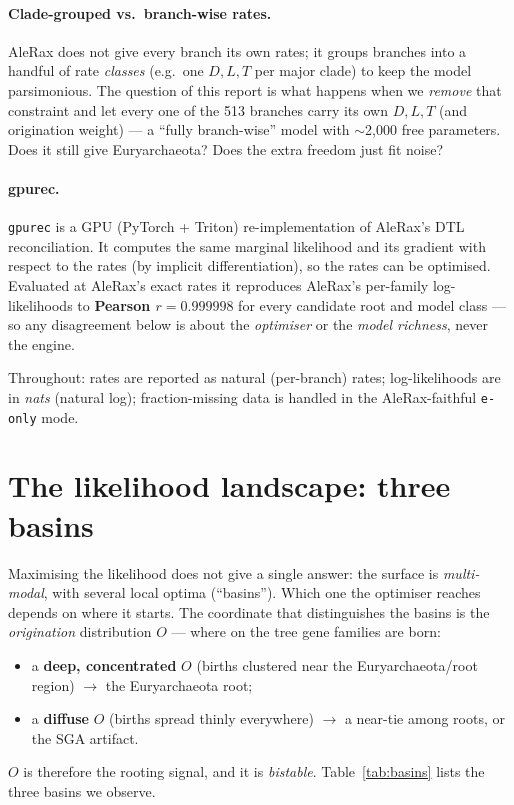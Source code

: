 \documentclass[11pt]{article}
\newcommand{\code}[1]{\texttt{\small #1}}
\begin{document}
\paragraph{Clade-grouped vs.\ branch-wise rates.} AleRax does not give every branch its own
rates; it groups branches into a handful of rate \emph{classes} (e.g.\ one $D,L,T$ per major
clade) to keep the model parsimonious. The question of this report is what happens when we
\emph{remove} that constraint and let every one of the 513 branches carry its own $D,L,T$
(and origination weight) --- a ``fully branch-wise'' model with $\sim$2{,}000 free
parameters. Does it still give Euryarchaeota? Does the extra freedom just fit noise?

\paragraph{gpurec.} \code{gpurec} is a GPU (PyTorch + Triton) re-implementation of AleRax's
DTL reconciliation. It computes the same marginal likelihood and its gradient with respect
to the rates (by implicit differentiation), so the rates can be optimised. Evaluated at
AleRax's exact rates it reproduces AleRax's per-family log-likelihoods to
\textbf{Pearson $r=0.999998$} for every candidate root and model class --- so any
disagreement below is about the \emph{optimiser} or the \emph{model richness}, never the
engine.

Throughout: rates are reported as natural (per-branch) rates; log-likelihoods are in
\emph{nats} (natural log); fraction-missing data is handled in the AleRax-faithful
\code{e-only} mode.

\FloatBarrier
\section{The likelihood landscape: three basins}
\label{sec:basins}
Maximising the likelihood does not give a single answer: the surface is \emph{multi-modal},
with several local optima (``basins''). Which one the optimiser reaches depends on where it
starts. The coordinate that distinguishes the basins is the \emph{origination} distribution
$O$ --- where on the tree gene families are born:
\begin{itemize}
  \item a \textbf{deep, concentrated} $O$ (births clustered near the Euryarchaeota/root
    region) $\to$ the Euryarchaeota root;
  \item a \textbf{diffuse} $O$ (births spread thinly everywhere) $\to$ a near-tie among
    roots, or the SGA artifact.
\end{itemize}
$O$ is therefore the rooting signal, and it is \emph{bistable}. Table~\ref{tab:basins} lists
the three basins we observe.
\end{document}
